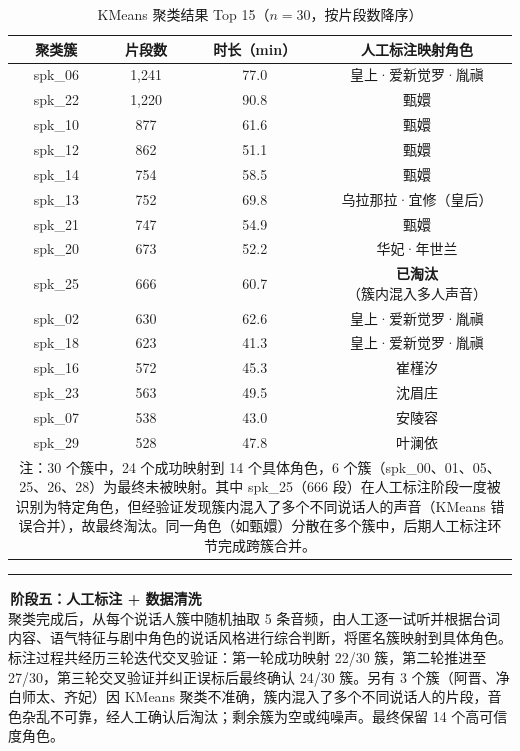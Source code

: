\documentclass[12pt,a4paper]{article}
\begin{document}
\begin{table}[H]
\centering
\caption{KMeans 聚类结果 Top 15（$n=30$，按片段数降序）}
\label{tab:cluster-top15}
\begin{tabular}{cccc}
\toprule
\textbf{聚类簇} & \textbf{片段数} & \textbf{时长（min）} & \textbf{人工标注映射角色} \\
\midrule
spk\_06 & 1,241 & 77.0 & 皇上·爱新觉罗·胤禛 \\
spk\_22 & 1,220 & 90.8 & 甄嬛 \\
spk\_10 & 877  & 61.6 & 甄嬛 \\
spk\_12 & 862  & 51.1 & 甄嬛 \\
spk\_14 & 754  & 58.5 & 甄嬛 \\
spk\_13 & 752  & 69.8 & 乌拉那拉·宜修（皇后） \\
spk\_21 & 747  & 54.9 & 甄嬛 \\
spk\_20 & 673  & 52.2 & 华妃·年世兰 \\
\rowcolor{red!15} spk\_25 & 666  & 60.7 & \textbf{已淘汰}（簇内混入多人声音） \\
spk\_02 & 630  & 62.6 & 皇上·爱新觉罗·胤禛 \\
spk\_18 & 623  & 41.3 & 皇上·爱新觉罗·胤禛 \\
spk\_16 & 572  & 45.3 & 崔槿汐 \\
spk\_23 & 563  & 49.5 & 沈眉庄 \\
spk\_07 & 538  & 43.0 & 安陵容 \\
spk\_29 & 528  & 47.8 & 叶澜依 \\
\bottomrule
\multicolumn{4}{p{0.95\textwidth}}{\footnotesize 注：30 个簇中，24 个成功映射到 14 个具体角色，6 个簇（spk\_00、01、05、25、26、28）为最终未被映射。其中 spk\_25（666 段）在人工标注阶段一度被识别为特定角色，但经验证发现簇内混入了多个不同说话人的声音（KMeans 错误合并），故最终淘汰。同一角色（如甄嬛）分散在多个簇中，后期人工标注环节完成跨簇合并。} \\
\end{tabular}
\end{table}

{\color{Amid}\rule{4pt}{0pt}}\,\textbf{\color{Amid}阶段五：人工标注 + 数据清洗}\\[3pt]
\hspace*{2em}聚类完成后，从每个说话人簇中随机抽取 5 条音频，由人工逐一试听并根据台词内容、语气特征与剧中角色的说话风格进行综合判断，将匿名簇映射到具体角色。标注过程共经历三轮迭代交叉验证：第一轮成功映射 22/30 簇，第二轮推进至 27/30，第三轮交叉验证并纠正误标后最终确认 24/30 簇。另有 3 个簇（阿晋、净白师太、齐妃）因 KMeans 聚类不准确，簇内混入了多个不同说话人的片段，音色杂乱不可靠，经人工确认后淘汰；剩余簇为空或纯噪声。最终保留 14 个高可信度角色。
\end{document}
